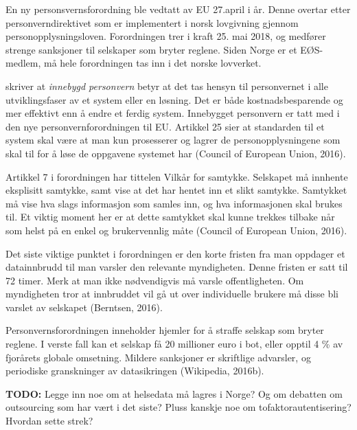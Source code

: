 En ny personsvernsforordning ble vedtatt av EU 27.april i år. Denne overtar
etter personverndirektivet som er implementert i norsk lovgivning gjennom
personopplysningsloven. Forordningen trer i kraft 25. mai 2018, og medfører
strenge sanksjoner til selskaper som bryter reglene. Siden Norge er et EØS-medlem,
må hele forordningen tas inn i det norske lovverket.

\citet{datatilsynet_privacy} skriver at \textit{innebygd personvern} betyr at det tas hensyn
til personvernet i alle utviklingsfaser av et system eller en løsning. Det er
både kostnadsbesparende og mer effektivt enn å endre et ferdig system. Innebygget
personvern er tatt med i den nye personvernforordningen til EU.
Artikkel 25 sier at standarden til et system skal være at man kun prosesserer
og lagrer de personopplysningene som skal til for å løse de oppgavene
systemet har (Council of European Union, 2016).

Artikkel 7 i forordningen har tittelen Vilkår for samtykke. Selskapet må
innhente eksplisitt samtykke, samt vise at det har hentet inn et slikt samtykke.
Samtykket må vise hva slags informasjon som samles inn, og hva informasjonen
skal brukes til. Et viktig moment her er at dette samtykket skal kunne
trekkes tilbake når som helst på en enkel og brukervennlig måte (Council of
European Union, 2016).

Det siste viktige punktet i forordningen er den korte fristen fra man oppdager
et datainnbrudd til man varsler den relevante myndigheten. Denne fristen er
satt til 72 timer. Merk at man ikke nødvendigvis må varsle offentligheten. Om
myndigheten tror at innbruddet vil gå ut over individuelle brukere må disse
bli varslet av selskapet (Berntsen, 2016).

Personvernsforordningen inneholder hjemler for å straffe selskap som bryter reglene.
I verste fall kan et selskap få 20 millioner euro i
bot, eller opptil 4 \% av fjorårets globale omsetning.
Mildere sanksjoner er skriftlige advarsler, og periodiske
granskninger av datasikringen (Wikipedia, 2016b).

\textbf{TODO:} Legge inn noe om at helsedata må lagres i Norge? Og om debatten om outsourcing som har vært i det siste?
Pluss kanskje noe om tofaktorautentisering? Hvordan sette strek?

